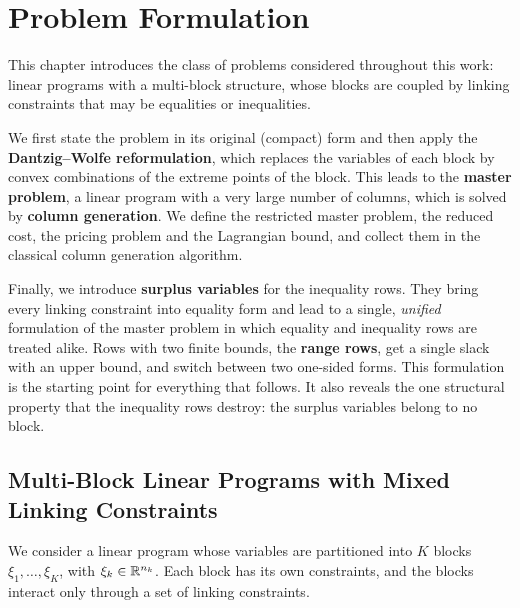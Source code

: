 \chapter{Problem Formulation}
\label{chap:formulation}

\vspace*{\fill}

This chapter introduces the class of problems considered throughout this work: linear
programs with a multi-block structure, whose blocks are coupled by linking constraints that
may be equalities or inequalities.

\medskip

We first state the problem in its original (compact) form and then apply the
\textbf{Dantzig--Wolfe reformulation}, which replaces the variables of each block by convex
combinations of the extreme points of the block. This leads to the \textbf{master problem},
a linear program with a very large number of columns, which is solved by
\textbf{column generation}. We define the restricted master problem, the reduced cost, the
pricing problem and the Lagrangian bound, and collect them in the classical column
generation algorithm.

\medskip

Finally, we introduce \textbf{surplus variables} for the inequality rows. They bring every
linking constraint into equality form and lead to a single, \emph{unified} formulation of the
master problem in which equality and inequality rows are treated alike. Rows with two finite
bounds, the \textbf{range rows}, get a single slack with an upper bound, and switch between
two one-sided forms. This formulation is
the starting point for everything that follows. It also reveals the one structural property
that the inequality rows destroy: the surplus variables belong to no block.

\vspace*{\fill}

\newpage


\section{Multi-Block Linear Programs with Mixed Linking Constraints}
\label{sec:multiblock}

We consider a linear program whose variables are partitioned into $K$ blocks
$\xi_1, \dots, \xi_K$, with $\xi_k \in \mathbb{R}^{n_k}$. Each block has its own constraints, and the blocks
interact only through a set of linking constraints.

